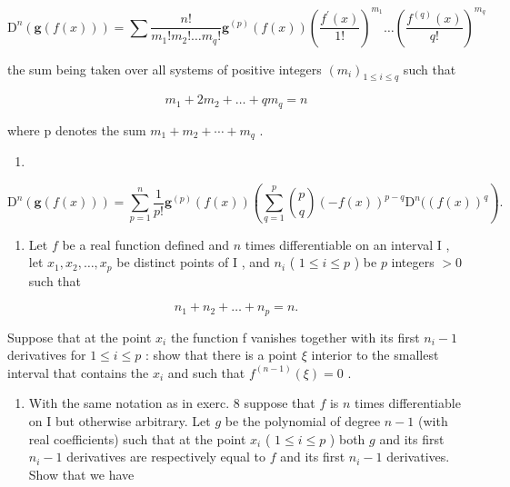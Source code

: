 \[
\mathrm{D} ^ {n} (\mathbf {g} (f (x))) = \sum \frac {n !}{m _ {1} ! m _ {2} ! \dots m _ {q} !} \mathbf {g} ^ {(p)} (f (x)) \left(\frac {f ^ {\prime} (x)}{1 !}\right) ^ {m _ {1}} \dots \left(\frac {f ^ {(q)} (x)}{q !}\right) ^ {m _ {q}}
\]

the sum being taken over all systems of positive integers \((m_{i})_{1\leqslant i\leqslant q}\) such that

\[
m _ {1} + 2 m _ {2} + \dots + q m _ {q} = n
\]

where p denotes the sum \(m_{1} + m_{2} + \cdots + m_{q}\) .

\begin{enumerate}
\def\labelenumi{\alph{enumi})}
\setcounter{enumi}{1}
\tightlist
\item
\end{enumerate}

\[
\mathrm{D} ^ {n} (\mathbf {g} (f (x))) = \sum_ {p = 1} ^ {n} \frac {1}{p !}   \mathbf {g} ^ {(p)} (f (x)) \left(\sum_ {q = 1} ^ {p} \binom {p} {q} (- f (x)) ^ {p - q}   \mathrm{D} ^ {n} ((f (x)) ^ {q}\right).
\]

\begin{enumerate}
\def\labelenumi{\arabic{enumi})}
\setcounter{enumi}{7}
\tightlist
\item
  Let \(f\) be a real function defined and \(n\) times differentiable on an interval \(\mathrm{I}\) , let \(x_{1}, x_{2}, \ldots, x_{p}\) be distinct points of \(\mathrm{I}\) , and \(n_{i}\) ( \(1 \leqslant i \leqslant p\) ) be \(p\) integers \(> 0\) such that
\end{enumerate}

\[
n _ {1} + n _ {2} + \dots + n _ {p} = n.
\]

Suppose that at the point \(x_{i}\) the function f vanishes together with its first \(n_{i}-1\) derivatives for \(1 \leqslant i \leqslant p\) : show that there is a point \(\xi\) interior to the smallest interval that contains the \(x_{i}\) and such that \(f^{(n-1)}(\xi) = 0\) .

\begin{enumerate}
\def\labelenumi{\arabic{enumi})}
\setcounter{enumi}{8}
\tightlist
\item
  With the same notation as in exerc. 8 suppose that \(f\) is \(n\) times differentiable on I but otherwise arbitrary. Let \(g\) be the polynomial of degree \(n - 1\) (with real coefficients) such that at the point \(x_{i}\) ( \(1 \leqslant i \leqslant p\) ) both \(g\) and its first \(n_{i} - 1\) derivatives are respectively equal to \(f\) and its first \(n_{i} - 1\) derivatives. Show that we have
\end{enumerate}

